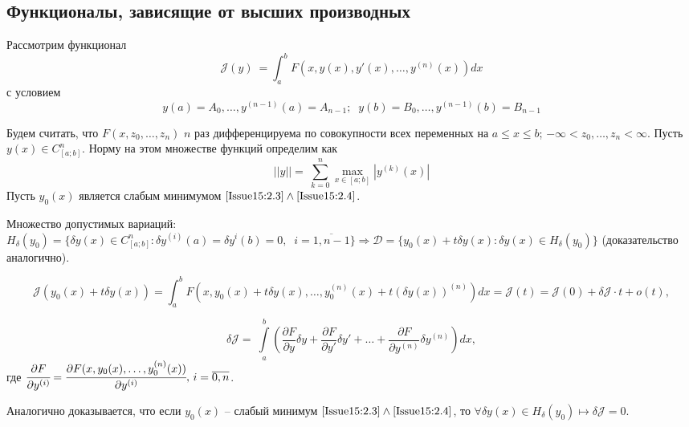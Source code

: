 
\subsection{Функционалы, зависящие от высших производных}
Рассмотрим функционал 
\begin{equation} 
	\label{Issue15:2.3}
	\mathcal{J}(y) ~ = \int_a^bF(x,y(x),y'(x),\dots , y^{(n)}(x))d x
\end{equation}
с условием 
\begin{equation}
	\label{Issue15:2.4}
	y(a)=A_0,\dots ,y^{(n-1)}(a)=A_{n-1};\;\;y(b)=B_0,\dots , y^{(n-1)}(b)=B_{n-1}
\end{equation}

Будем считать, что $F(x,z_0,\dots , z_n)$ $n$ раз дифференцируема по совокупности всех переменных на $a\leqslant x\leqslant b$; $-\infty < z_0, \dots , z_n< \infty $. Пусть $y(x)\in C^n_{[a;b]}$. Норму на этом множестве функций определим как $$||y||= ~ \sum_{k=0}^{n}\underset{x \in [a;b]}{\max}|y^{(k)}(x)|$$
Пусть $y_0(x)$ является слабым минимумом $\eqref{Issue15:2.3}\wedge \eqref{Issue15:2.4}$.

Множество допустимых вариаций: $H_\delta(y_0)=\{ \delta y(x) \in C_{[a;b]}^n: \delta y^{(i)}(a)=\delta y^{i}(b)=0,\;\;i=\overline{1,n-1}\}\Rightarrow \mathcal{D}=\{y_0(x)+t\delta y(x):\delta y(x)\in H_\delta (y_0) \}$ (доказательство аналогично).

\[
    \mathcal{J}(y_0(x)+t\delta y(x)) = \int^b_a F(x, y_0(x)+t\delta y(x),\dots ,y_0^{(n)}(x)+t(\delta y(x))^{(n)} )dx =\mathcal{J}(t)=\mathcal{J}(0)+\delta\mathcal{J} \cdot t+o(t), 
\]

\[
    \delta \mathcal{J}= ~ \int\limits_a^b\left(\frac{\partial F}{\partial y}\delta y + \frac{\partial F}{\partial y'}\delta y' +\dots +  \frac{\partial F}{\partial y^{(n)}}\delta y^{(n)} \right) dx,
\]
 где $\cfrac{\partial F}{\partial y^{(i)}}= \cfrac{\partial F(x,y_0(x),\dots,y_0^{(n)}(x))}{\partial y^{(i)}}, \, i = \overline{0, n}$.

Аналогично доказывается, что если $y_0(x)$ -- слабый минимум $\eqref{Issue15:2.3}\wedge\eqref{Issue15:2.4}$, то $\forall\delta y(x)\in H_\delta (y_0) \mapsto \delta \mathcal{J} = 0$.

